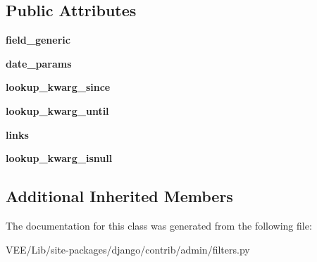 \subsection*{Public Attributes}
\begin{DoxyCompactItemize}
\item 
\mbox{\label{classdjango_1_1contrib_1_1admin_1_1filters_1_1_date_field_list_filter_a2bf7d6858e7b47413534b5807b17a70f}} 
{\bfseries field\+\_\+generic}
\item 
\mbox{\label{classdjango_1_1contrib_1_1admin_1_1filters_1_1_date_field_list_filter_a563a4100326b889f0cbd9e99033a0c55}} 
{\bfseries date\+\_\+params}
\item 
\mbox{\label{classdjango_1_1contrib_1_1admin_1_1filters_1_1_date_field_list_filter_ad457c951f110c0400b0b710ee54645a4}} 
{\bfseries lookup\+\_\+kwarg\+\_\+since}
\item 
\mbox{\label{classdjango_1_1contrib_1_1admin_1_1filters_1_1_date_field_list_filter_a80386317b114e5103ea9740fa6dc2a71}} 
{\bfseries lookup\+\_\+kwarg\+\_\+until}
\item 
\mbox{\label{classdjango_1_1contrib_1_1admin_1_1filters_1_1_date_field_list_filter_ac53e88d4782baf216d33c73630e409ae}} 
{\bfseries links}
\item 
\mbox{\label{classdjango_1_1contrib_1_1admin_1_1filters_1_1_date_field_list_filter_a162b4bf76ac6ad4e060112dfed865ade}} 
{\bfseries lookup\+\_\+kwarg\+\_\+isnull}
\end{DoxyCompactItemize}
\subsection*{Additional Inherited Members}


The documentation for this class was generated from the following file\+:\begin{DoxyCompactItemize}
\item 
V\+E\+E/\+Lib/site-\/packages/django/contrib/admin/filters.\+py\end{DoxyCompactItemize}
